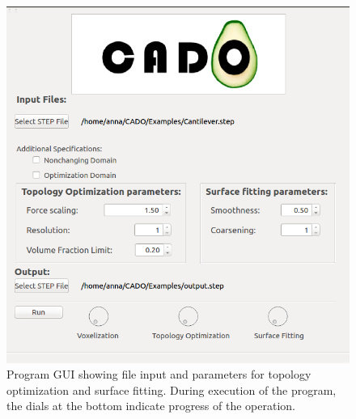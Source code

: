 \begin{figure}[h]
\centering
\includegraphics[scale=0.5]{Pictures/CADO_mainWindowParameters.png}
\caption{Program GUI showing file input and parameters for topology optimization and surface fitting. During execution of the program, the dials at the bottom indicate progress of the operation.}
\label{fig:mainWindowParameters}
\end{figure}